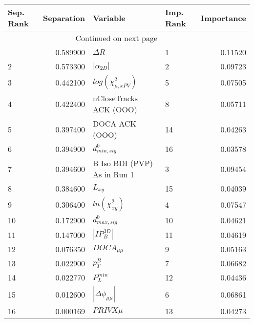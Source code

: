 \usepackage{lscape}

\begin{landscape}
\begin{longtable}{lrllr}
\toprule
Sep. Rank &  Separation &                     Variable & Imp. Rank &  Importance \\
\midrule
\endhead
\midrule
\multicolumn{3}{r}{{Continued on next page}} \\
\midrule
\endfoot

\bottomrule
\endlastfoot
        1 &    0.589900 &                   $\Delta R$ &         1 &     0.11520 \\
        2 &    0.573300 &              $|\alpha_{2D}|$ &         2 &     0.09723 \\
        3 &    0.442100 &    $log(\chi^{2}_{\mu,xPV})$ &         5 &     0.07505 \\
        4 &    0.422400 &       nCloseTracks ACK (OOO) &         8 &     0.05711 \\
        5 &    0.397400 &               DOCA ACK (OOO) &        14 &     0.04263 \\
        6 &    0.394900 &             $d^0_{min, sig}$ &        16 &     0.03578 \\
        7 &    0.394600 &  B Iso BDI (PVP) As in Run 1 &         3 &     0.09454 \\
        8 &    0.384600 &                     $L_{xy}$ &        15 &     0.04039 \\
        9 &    0.306400 &          $ln(\chi^{2}_{xy})$ &         4 &     0.07547 \\
       10 &    0.172900 &             $d^0_{max, sig}$ &        10 &     0.04621 \\
       11 &    0.147000 &              $|IP_{B}^{3D}|$ &        11 &     0.04619 \\
       12 &    0.076350 &              $DOCA_{\mu\mu}$ &         9 &     0.05163 \\
       13 &    0.022900 &                    $p^B_{T}$ &         7 &     0.06682 \\
       14 &    0.022770 &                $P^{min}_{L}$ &        12 &     0.04436 \\
       15 &    0.012600 &     $|\Delta \phi_{\mu\mu}|$ &         6 &     0.06861 \\
       16 &    0.000169 &                   $PRIVX\mu$ &        13 &     0.04273 \\
\end{longtable}

\end{landscape}
